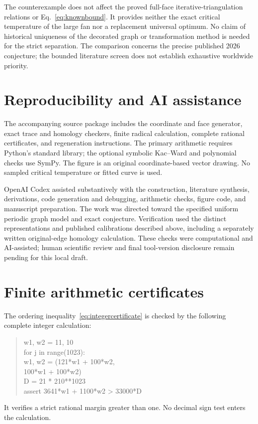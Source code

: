 \documentclass[aps,pre,reprint,amsmath,amssymb,nofootinbib,longbibliography,floatfix]{revtex4-2}
\begin{document}
The counterexample does not affect the proved full-face iterative-triangulation relations or Eq.~\eqref{eq:knownbound}. It provides neither the exact critical temperature of the large fan nor a replacement universal optimum. No claim of historical uniqueness of the decorated graph or transformation method is needed for the strict separation. The comparison concerns the precise published 2026 conjecture; the bounded literature screen does not establish exhaustive worldwide priority.

\section{Reproducibility and AI assistance}
The accompanying source package includes the coordinate and face generator, exact trace and homology checkers, finite radical calculation, complete rational certificates, and regeneration instructions. The primary arithmetic requires Python's standard library; the optional symbolic Kac--Ward and polynomial checks use SymPy. The figure is an original coordinate-based vector drawing. No sampled critical temperature or fitted curve is used.

OpenAI Codex assisted substantively with the construction, literature synthesis, derivations, code generation and debugging, arithmetic checks, figure code, and manuscript preparation. The work was directed toward the specified uniform periodic graph model and exact conjecture. Verification used the distinct representations and published calibrations described above, including a separately written original-edge homology calculation. These checks were computational and AI-assisted; human scientific review and final tool-version disclosure remain pending for this local draft.

\appendix
\section{Finite arithmetic certificates}\label{app:arithmetic}
The ordering inequality~\eqref{eq:integercertificate} is checked by the following complete integer calculation:
\begin{quote}\ttfamily\small
w1, w2 = 11, 10\\
for j in range(1023):\\
\hspace*{1em}w1, w2 = (121*w1 + 100*w2,\\
\hspace*{6em}100*w1 + 100*w2)\\
D = 21 * 210**1023\\
assert 3641*w1 + 1100*w2 > 33000*D
\end{quote}
It verifies a strict rational margin greater than one. No decimal sign test enters the calculation.
\end{document}
